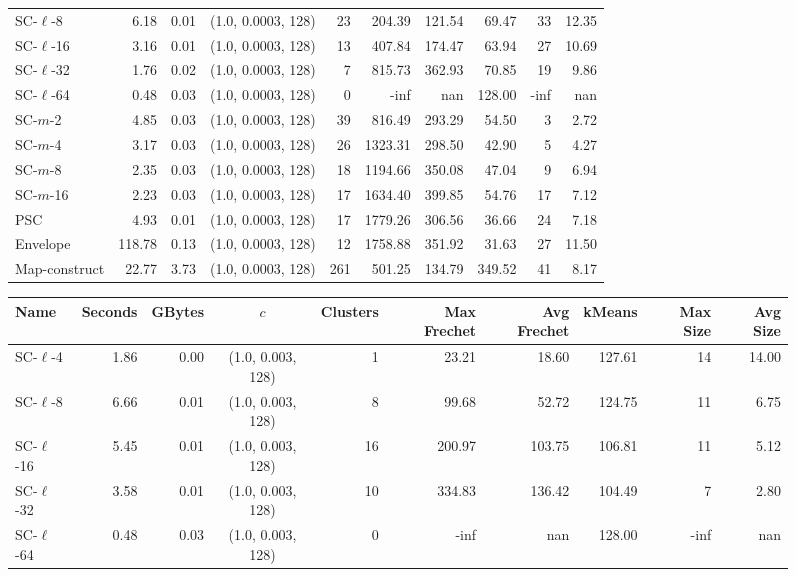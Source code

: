 \begin{figure}
\begin{center}
\begin{minipage}{\textwidth}
{\begin{tabular}{@{}lrrcrrrrrr@{}}
        SC-$\ell$-8 & 6.18 & 0.01 & (1.0, 0.0003, 128) & 23 & 204.39 & 121.54 & 69.47 & 33 & 12.35\\
        SC-$\ell$-16 & 3.16 & 0.01 & (1.0, 0.0003, 128) & 13 & 407.84 & 174.47 & 63.94 & 27 & 10.69\\
        SC-$\ell$-32 & 1.76 & 0.02 & (1.0, 0.0003, 128) & 7 & 815.73 & 362.93 & 70.85 & 19 & 9.86\\
        SC-$\ell$-64 & 0.48 & 0.03 & (1.0, 0.0003, 128) & 0 & -inf & nan & 128.00 & -inf & nan\\
        SC-$m$-2 & 4.85 & 0.03 & (1.0, 0.0003, 128) & 39 & 816.49 & 293.29 & 54.50 & 3 & 2.72\\
        SC-$m$-4 & 3.17 & 0.03 & (1.0, 0.0003, 128) & 26 & 1323.31 & 298.50 & 42.90 & 5 & 4.27\\
        SC-$m$-8 & 2.35 & 0.03 & (1.0, 0.0003, 128) & 18 & 1194.66 & 350.08 & 47.04 & 9 & 6.94\\
        SC-$m$-16 & 2.23 & 0.03 & (1.0, 0.0003, 128) & 17 & 1634.40 & 399.85 & 54.76 & 17 & 7.12\\
        PSC & 4.93 & 0.01 & (1.0, 0.0003, 128) & 17 & 1779.26 & 306.56 & 36.66 & 24 & 7.18\\
        Envelope & 118.78 & 0.13 & (1.0, 0.0003, 128) & 12 & 1758.88 & 351.92 & 31.63 & 27 & 11.50\\
        Map-construct & 22.77 & 3.73 & (1.0, 0.0003, 128) & 261 & 501.25 & 134.79 & 349.52 & 41 & 8.17\\
        \bottomrule
    \end{tabular}}
    {
    \begin{tabular}{@{}lrrcrrrrrr@{}}
        \toprule
        Name & Seconds & GBytes & $c$ & Clusters & Max Frechet & Avg Frechet & kMeans & Max Size & Avg Size\\
        \midrule
        SC-$\ell$-4 & 1.86 & 0.00 & (1.0, 0.003, 128) & 1 & 23.21 & 18.60 & 127.61 & 14 & 14.00\\
        SC-$\ell$-8 & 6.66 & 0.01 & (1.0, 0.003, 128) & 8 & 99.68 & 52.72 & 124.75 & 11 & 6.75\\
        SC-$\ell$-16 & 5.45 & 0.01 & (1.0, 0.003, 128) & 16 & 200.97 & 103.75 & 106.81 & 11 & 5.12\\
        SC-$\ell$-32 & 3.58 & 0.01 & (1.0, 0.003, 128) & 10 & 334.83 & 136.42 & 104.49 & 7 & 2.80\\
        SC-$\ell$-64 & 0.48 & 0.03 & (1.0, 0.003, 128) & 0 & -inf & nan & 128.00 & -inf & nan\\

\end{tabular}}
\end{minipage}
\end{center}
\end{figure}
